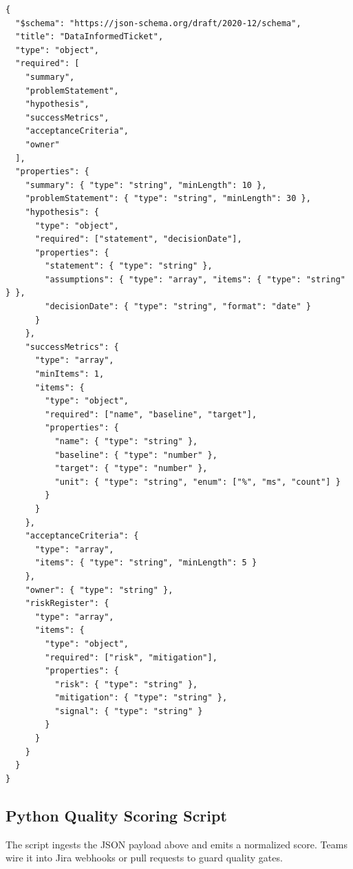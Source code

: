 \begin{lstlisting}[caption={JSON Schema for a data-informed Jira ticket.}]
{
  "$schema": "https://json-schema.org/draft/2020-12/schema",
  "title": "DataInformedTicket",
  "type": "object",
  "required": [
    "summary",
    "problemStatement",
    "hypothesis",
    "successMetrics",
    "acceptanceCriteria",
    "owner"
  ],
  "properties": {
    "summary": { "type": "string", "minLength": 10 },
    "problemStatement": { "type": "string", "minLength": 30 },
    "hypothesis": {
      "type": "object",
      "required": ["statement", "decisionDate"],
      "properties": {
        "statement": { "type": "string" },
        "assumptions": { "type": "array", "items": { "type": "string" } },
        "decisionDate": { "type": "string", "format": "date" }
      }
    },
    "successMetrics": {
      "type": "array",
      "minItems": 1,
      "items": {
        "type": "object",
        "required": ["name", "baseline", "target"],
        "properties": {
          "name": { "type": "string" },
          "baseline": { "type": "number" },
          "target": { "type": "number" },
          "unit": { "type": "string", "enum": ["%", "ms", "count"] }
        }
      }
    },
    "acceptanceCriteria": {
      "type": "array",
      "items": { "type": "string", "minLength": 5 }
    },
    "owner": { "type": "string" },
    "riskRegister": {
      "type": "array",
      "items": {
        "type": "object",
        "required": ["risk", "mitigation"],
        "properties": {
          "risk": { "type": "string" },
          "mitigation": { "type": "string" },
          "signal": { "type": "string" }
        }
      }
    }
  }
}
\end{lstlisting}

\subsection{Python Quality Scoring Script}
The script ingests the JSON payload above and emits a normalized score. Teams wire it into Jira webhooks or pull requests to guard quality gates.

